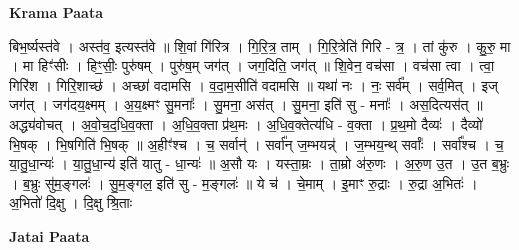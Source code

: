 \documentclass[17pt]{extarticle}
\begin{document}
\textbf{Krama Paata} \newline

बिभ॒र्ष्यस्त॑वे । अस्त॑व॒ इत्यस्त॑वे ॥ शि॒वां गि॑रित्र । गि॒रि॒त्र॒ ताम् । गि॒रि॒त्रेति॑ गिरि - त्र॒ । तां कु॑रु । कु॒रु॒ मा । मा हिꣳ॑सीः । हिꣳ॒॒सीः॒ पुरु॑षम् । पुरु॑ष॒म् जग॑त् । जग॒दिति॒ जग॑त् ॥ शि॒वेन॒ वच॑सा । वच॑सा त्वा । त्वा॒ गिरि॑श । गिरि॒शाच्छ॑ । अच्छा॑ वदामसि । व॒दा॒म॒सीति॑ वदामसि ॥ यथा॑ नः । नः॒ सर्व᳚म् । सर्व॒मित् । इज् जग॑त् । जग॑दय॒क्ष्मम् । अ॒य॒क्ष्मꣳ सु॒मनाः᳚ । सु॒मना॒ अस॑त् । सु॒मना॒ इति॑ सु - मनाः᳚ । अस॒दित्यस॑त् ॥ अद्ध्य॑वोचत् । अ॒वो॒च॒द॒धि॒व॒क्ता । अ॒धि॒व॒क्ता प्र॑थ॒मः । अ॒धि॒व॒क्तेत्य॑धि - व॒क्ता । प्र॒थ॒मो दैव्यः॑ । दैव्यो॑ भि॒षक् । भि॒षगिति॑ भि॒षक् ॥ अ॒हीꣳ॑श्च । च॒ सर्वान्॑ । सर्वा᳚न् ज॒म्भयन्न्॑ । ज॒म्भय॒न्थ् सर्वाः᳚ । सर्वा᳚श्च । च॒ या॒तु॒धा॒न्यः॑ । या॒तु॒धा॒न्य॑ इति॑ यातु - धा॒न्यः॑ ॥ अ॒सौ यः । यस्ता॒म्रः । ता॒म्रो अ॑रु॒णः । अ॒रु॒ण उ॒त । उ॒त ब॒भ्रुः । ब॒भ्रुः सु॑म॒ङ्गलः॑ । सु॒म॒ङ्गल॒ इति॑ सु - म॒ङ्गलः॑ ॥ ये च॑ । चे॒माम् । इ॒माꣳ रु॒द्राः । रु॒द्रा अ॒भितः॑ । अ॒भितो॑ दि॒क्षु । दि॒क्षु श्रि॒ताः \newline

\textbf{Jatai Paata} \newline
\end{document}
